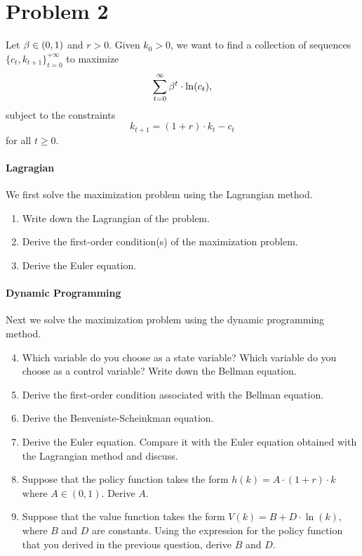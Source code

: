 \documentclass[letterpaper,12pt,leqno]{article}
\begin{document}
\section*{Problem 2}

Let $\beta \in (0,1)$ and $r>0$. Given $k_{0}>0$, we want to find a collection of sequences $\{c_{t},k_{t+1}\}_{t=0}^{+\infty}$ to maximize 
\begin{equation*}
\sum_{t=0}^{\infty }\b^{t} \cdot \ln(c_{t}), 
\end{equation*}
subject to the constraints
\begin{equation*}
k_{t+1}=(1+r)\cdot k_{t}-c_{t}
\end{equation*}
for all $t\geq 0$.

\paragraph{Lagragian} We first solve the maximization problem using the Lagrangian method.

\begin{enumerate}
\item Write down the Lagrangian of the problem.
\item Derive the first-order condition(s) of the maximization problem.
\item Derive the Euler equation.
\end{enumerate}

\paragraph{Dynamic Programming} Next we solve the maximization problem using the dynamic programming method.

\begin{enumerate}\setcounter{enumi}{3}

\item Which variable do you choose as a state variable? Which variable do you choose as a control variable? Write down the Bellman equation.

\item  Derive the first-order condition associated with the Bellman equation.

\item  Derive the Benveniste-Scheinkman equation.

\item  Derive the Euler equation. Compare it with the Euler equation obtained with the Lagrangian method and discuss.

\item Suppose that the policy function takes the form $h(k)=A\cdot (1+r)\cdot k$ where $A\in (0,1) $. Derive $A$.

\item  Suppose that the value function takes the form $V(k)=B+D\cdot \ln(k),$ where $B$ and $D$ are constants. Using the expression for the policy function that you derived in the previous question, derive $B$ and $D$.

\end{enumerate}
\end{document}
